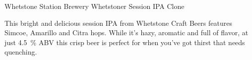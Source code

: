 \begin{recipie}{Whetstone Station Brewery Whetstoner Session IPA Clone}

\begin{aboutblock}
This bright and delicious session IPA from Whetstone Craft Beers features Simcoe,
Amarillo and Citra hops. While it's hazy, aromatic and full of flavor, at just
4.5~\% ABV this crisp beer is perfect for when you've got thirst that needs quenching.
\sourceaha
\end{aboutblock}


\begin{methodandtiming}
 
\begin{mashsteps}
\end{mashsteps}

\begin{fermentationsteps}
\end{fermentationsteps}

\end{methodandtiming}

\pagebreak

\begin{ingredientsblock}

\begin{malts}
\end{malts}

\begin{hops}
\end{hops}


\end{ingredientsblock}

\end{recipie}

